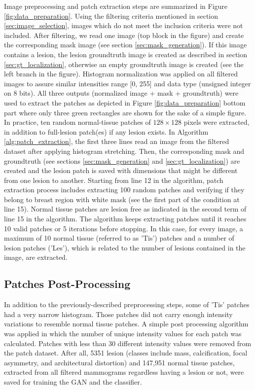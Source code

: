 \documentclass[final,3p,twocolumn,authoryear,sort&compress,times]{maia}
\begin{document}
Image preprocessing and patch extraction steps are summarized in Figure \ref{fig:data_preparation}. Using the filtering criteria mentioned in section \ref{sec:image_selection}, images which do not meet the inclusion criteria were not included. After filtering, we read one image (top block in the figure) and create the corresponding mask image (see section \ref{sec:mask_generation}). If this image contains a lesion, the lesion groundtruth image is created as described in section \ref{sec:gt_localization}, otherwise an empty groundtruth image is created (see the left branch in the figure). Histogram normalization was applied on all filtered images to assure similar intensities range [0, 255] and data type (unsigned integer on 8 bits). All three outputs (normalized image + mask + groundtruth) were used to extract the patches as depicted in Figure \ref{fig:data_preparation} bottom part where only three green rectangles are shown for the sake of a simple figure. In practice, ten random normal-tissue patches of $128 \times 128$ pixels were extracted, in addition to full-lesion patch(es) if any lesion exists. In Algorithm \ref{alg:patch_extraction}, the first three lines read an image from the filtered dataset after applying histogram stretching. Then, the corresponding mask and groundtruth (see sections \ref{sec:mask_generation} and \ref{sec:gt_localization}) are created and the lesion patch is saved with dimensions that might be different from one lesion to another. Starting from line 12 in the algorithm, patch extraction process includes extracting 100 random patches and verifying if they belong to breast region with white mask (see the first part of the condition at line 15). Normal tissue patches are lesion free as indicated in the second term of line 15 in the algorithm. The algorithm keeps extracting patches until it reaches 10 valid patches or 5 iterations before stopping. In this case, for every image, a maximum of 10 normal tissue (referred to as 'Tis') patches and a number of lesion patches ('Les'), which is related to the number of lesions contained in the image, are extracted.

\subsection{Patches Post-Processing}
\label{sec:post_processing}

In addition to the previously-described preprocessing steps, some of 'Tis' patches had a very narrow histogram. Those patches did not carry enough intensity variations to resemble normal tissue patches. A simple post processing algorithm was applied in which the number of unique intensity values for each patch was calculated. Patches with less than 30 different intensity values were removed from the patch dataset. After all, 5351 lesion (classes include mass, calcification, focal asymmetry, and architectural distortion) and 147,951 normal tissue patches, extracted from all filtered mammograms regardless having a lesion or not, were saved for training the GAN and the classifier.
\end{document}

